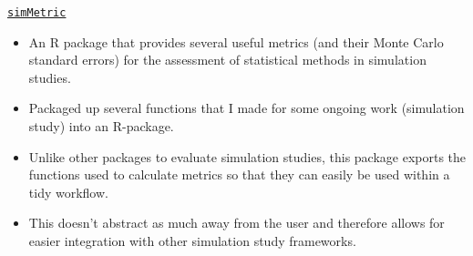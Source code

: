 \texttt{\href{https://github.com/RWParsons/simMetric}{simMetric}} \par
\begin{itemize}
    \item An R package that provides several useful metrics (and their Monte Carlo standard errors) for the assessment of statistical methods in simulation studies.
	\item Packaged up several functions that I made for some ongoing work (simulation study) into an R-package.
	\item Unlike other packages to evaluate simulation studies, this package exports the functions used to calculate metrics so that they can easily be used within a tidy workflow.
    \item This doesn't abstract as much away from the user and therefore allows for easier integration with other simulation study frameworks.
\end{itemize}